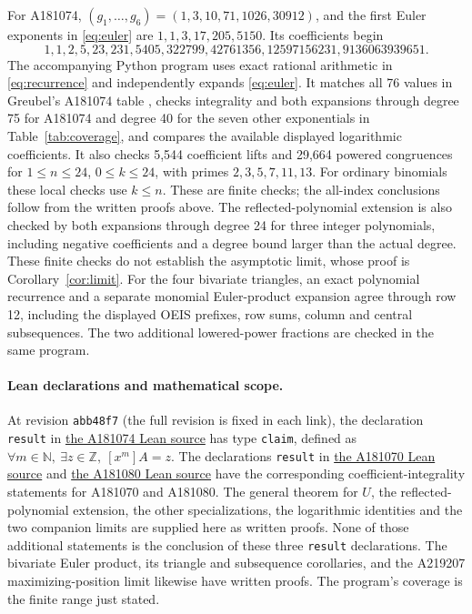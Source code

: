 \documentclass[11pt]{article}
\begin{document}
For A181074, \((g_1,\ldots,g_6)=(1,3,10,71,1026,30912)\), and the first
Euler exponents in \eqref{eq:euler} are \(1,1,3,17,205,5150\).
Its coefficients begin
\[
 1,1,2,5,23,231,5405,322799,42761356,12597156231,9136063939651.
\]
The accompanying Python program uses exact rational arithmetic in
\eqref{eq:recurrence} and independently expands \eqref{eq:euler}.
It matches all 76 values in Greubel's A181074 table \cite{table74}, checks
integrality and both expansions through degree 75 for A181074 and degree 40
for the seven other exponentials in Table~\ref{tab:coverage}, and compares the
available displayed logarithmic coefficients. It also checks 5,544 coefficient
lifts and 29,664 powered congruences for \(1\le n\le24\), \(0\le k\le24\),
with primes \(2,3,5,7,11,13\). For ordinary binomials these local checks use
\(k\le n\). These are finite checks; the all-index conclusions follow from
the written proofs above. The reflected-polynomial extension is also checked
by both expansions through degree 24 for three integer polynomials,
including negative coefficients and a degree bound larger than the actual
degree. These finite checks do not establish the asymptotic limit, whose
proof is Corollary~\ref{cor:limit}.
For the four bivariate triangles, an exact polynomial recurrence and a
separate monomial Euler-product expansion agree through row 12, including
the displayed OEIS prefixes, row sums, column and central subsequences.
The two additional lowered-power fractions are checked in the same program.

\paragraph{Lean declarations and mathematical scope.}
At revision \texttt{abb48f7} (the full revision is fixed in each link), the declaration
\texttt{result} in
\href{https://github.com/the-omega-institute/trureturing/blob/abb48f723fe221da235c625800ba0d2ca1755296/D5/S1/Recurrence/Algebraic/HannaA181074Integrality.lean}{the A181074 Lean source}
has type \texttt{claim}, defined as
\(\forall m\in\mathbb N,\ \exists z\in\mathbb Z,\ [x^m]A=z\).
The declarations \texttt{result} in
\href{https://github.com/the-omega-institute/trureturing/blob/abb48f723fe221da235c625800ba0d2ca1755296/D5/S1/Recurrence/Algebraic/HannaA181070Integrality.lean}{the A181070 Lean source}
and
\href{https://github.com/the-omega-institute/trureturing/blob/abb48f723fe221da235c625800ba0d2ca1755296/D5/S1/Recurrence/Algebraic/HannaA181080Integrality.lean}{the A181080 Lean source}
have the corresponding coefficient-integrality statements for A181070 and
A181080. The general theorem for \(U\), the reflected-polynomial extension,
the other specializations, the logarithmic identities and the two companion limits
are supplied here as written proofs. None of those additional statements
is the conclusion of these three \texttt{result} declarations.
The bivariate Euler product, its triangle and subsequence corollaries,
and the A219207 maximizing-position limit likewise have written proofs.
The program's coverage is the finite range just stated.
\end{document}
